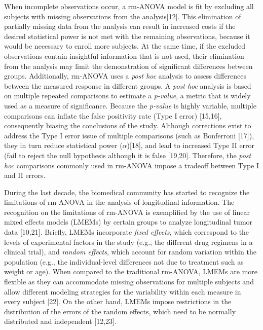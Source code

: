 \documentclass[
]{article}
\begin{document}
When incomplete observations occur, a rm-ANOVA model is fit by excluding all subjects with missing observations from the analysis{[}12{]}. This elimination of partially missing data from the analysis can result in increased costs if the desired statistical power is not met with the remaining observations, because it would be necessary to enroll more subjects. At the same time, if the excluded observations contain insightful information that is not used, their elimination from the analysis may limit the demonstration of significant differences between groups. Additionally, rm-ANOVA uses a \emph{post hoc} analysis to assess differences between the measured response in different groups. A \emph{post hoc} analysis is based on multiple repeated comparisons to estimate a \emph{p-value}, a metric that is widely used as a measure of significance. Because the \emph{p-value} is highly variable, multiple comparisons can inflate the false positivity rate (Type I error) {[}15,16{]}, consequently biasing the conclusions of the study. Although corrections exist to address the Type I error issue of multiple comparisons (such as Bonferroni {[}17{]}), they in turn reduce statistical power (\(\alpha\)){[}18{]}, and lead to increased Type II error (fail to reject the null hypothesis although it is false {[}19,20{]}. Therefore, the \emph{post hoc} comparisons commonly used in rm-ANOVA impose a tradeoff between Type I and II errors.

During the last decade, the biomedical community has started to recognize the limitations of rm-ANOVA in the analysis of longitudinal information. The recognition on the limitations of rm-ANOVA is exemplified by the use of linear mixed effects models (LMEMs) by certain groups to analyze longitudinal tumor data {[}10,21{]}. Briefly, LMEMs incorporate \emph{fixed effects}, which correspond to the levels of experimental factors in the study (e.g., the different drug regimens in a clinical trial), and \emph{random effects}, which account for random variation within the population (e.g., the individual-level differences not due to treatment such as weight or age). When compared to the traditional rm-ANOVA, LMEMs are more flexible as they can accommodate missing observations for multiple subjects and allow different modeling strategies for the variability within each measure in every subject {[}22{]}. On the other hand, LMEMs impose restrictions in the distribution of the errors of the random effects, which need to be normally distributed and independent {[}12,23{]}.
\end{document}

